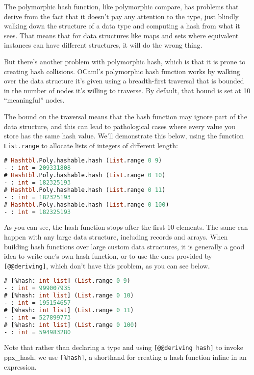 The polymorphic hash function, like polymorphic compare, has problems
that derive from the fact that it doesn't pay any attention to the type,
just blindly walking down the structure of a data type and computing a
hash from what it sees. That means that for data structures like maps
and sets where equivalent instances can have different structures, it
will do the wrong thing.

But there's another problem with polymorphic hash, which is that it is
prone to creating hash collisions. OCaml's polymorphic hash function
works by walking over the data structure it's given using a
breadth-first traversal that is bounded in the number of nodes it's
willing to traverse. By default, that bound is set at 10 ``meaningful''
nodes. 

The bound on the traversal means that the hash function may ignore part
of the data structure, and this can lead to pathological {cases} where
every value you store has the same hash value. We'll demonstrate this
below, using the function \passthrough{\lstinline!List.range!} to
allocate lists of integers of different length:

\begin{lstlisting}[language=Caml]
# Hashtbl.Poly.hashable.hash (List.range 0 9)
- : int = 209331808
# Hashtbl.Poly.hashable.hash (List.range 0 10)
- : int = 182325193
# Hashtbl.Poly.hashable.hash (List.range 0 11)
- : int = 182325193
# Hashtbl.Poly.hashable.hash (List.range 0 100)
- : int = 182325193
\end{lstlisting}

As you can see, the hash function stops after the first 10 elements. The
same can happen with any large data structure, including records and
arrays. When building hash functions over large custom data structures,
it is generally a good idea to write one's own hash function, or to use
the ones provided by \passthrough{\lstinline![@@deriving]!}, which don't
have this problem, as you can see below.

\begin{lstlisting}[language=Caml]
# [%hash: int list] (List.range 0 9)
- : int = 999007935
# [%hash: int list] (List.range 0 10)
- : int = 195154657
# [%hash: int list] (List.range 0 11)
- : int = 527899773
# [%hash: int list] (List.range 0 100)
- : int = 594983280
\end{lstlisting}

Note that rather than declaring a type and using
\passthrough{\lstinline![@@deriving hash]!} to invoke ppx\_hash, we use
\passthrough{\lstinline![\%hash]!}, a shorthand for creating a hash
function inline in an expression.

